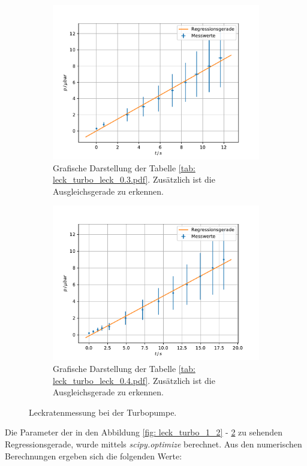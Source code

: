 \begin{figure}[h]
    \centering
    \begin{subfigure}{0.4\textwidth}
        \centering
        \includegraphics[width=1\textwidth]{../Messdaten/plots/turbo/leckrate_turbo_03.pdf}
        \caption{Grafische Darstellung der Tabelle \ref{tab: leck_turbo_leck_0.3.pdf}. Zusätzlich ist die Ausgleichsgerade zu erkennen.}
        \label{fig: turbo_leck_1_2}
    \end{subfigure}
    \begin{subfigure}{0.4\textwidth}
        \centering
        \includegraphics[width=1\textwidth]{../Messdaten/plots/turbo/leckrate_turbo_04.pdf}
        \caption{Grafische Darstellung der Tabelle \ref{tab: leck_turbo_leck_0.4.pdf}. Zusätzlich ist die Ausgleichsgerade zu erkennen.}
    \end{subfigure}
    \caption{Leckratenmessung bei der Turbopumpe.}
      \label{fig: leck_turbo_2_2}
\end{figure}
Die Parameter der in den Abbildung \ref{fig: leck_turbo_1_2} - \ref{fig: leck_turbo_2_2} zu sehenden Regressionsgerade,
wurde mittels \emph{scipy.optimize} berechnet. Aus den numerischen Berechnungen ergeben sich die folgenden
Werte:

